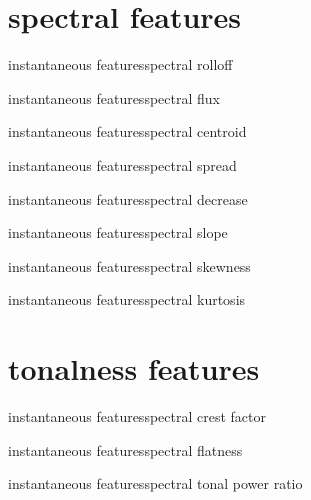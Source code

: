     \section[spectral shape]{spectral features}
        \begin{frame}{instantaneous features}{spectral rolloff}
        \end{frame}
        \begin{frame}{instantaneous features}{spectral flux}
        \end{frame}
        \begin{frame}{instantaneous features}{spectral centroid}
        \end{frame}
        \begin{frame}{instantaneous features}{spectral spread}
        \end{frame}
        \begin{frame}{instantaneous features}{spectral decrease}
        \end{frame}
        \begin{frame}{instantaneous features}{spectral slope}
        \end{frame}
        \begin{frame}{instantaneous features}{spectral skewness}
        \end{frame}
        \begin{frame}{instantaneous features}{spectral kurtosis}
        \end{frame}

    \section[tonalness]{tonalness features}
        \begin{frame}{instantaneous features}{spectral crest factor}
        \end{frame}
        \begin{frame}{instantaneous features}{spectral flatness}
        \end{frame}
        \begin{frame}{instantaneous features}{spectral tonal power ratio}
        \end{frame}
        

